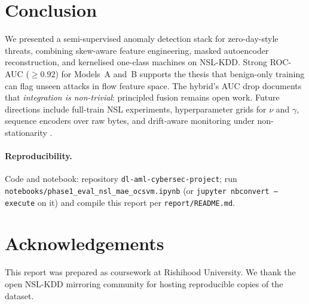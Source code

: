 \documentclass[11pt,a4paper]{article}
\begin{document}
\section{Conclusion}
\label{sec:conclusion}

We presented a semi-supervised anomaly detection stack for zero-day-style threats, combining skew-aware feature engineering, masked autoencoder reconstruction, and kernelised one-class machines on NSL-KDD. Strong ROC-AUC ($\geq 0.92$) for Models~A and~B supports the thesis that benign-only training can flag unseen attacks in flow feature space. The hybrid's AUC drop documents that \emph{integration is non-trivial}: principled fusion remains open work. Future directions include full-train NSL experiments, hyperparameter grids for $\nu$ and $\gamma$, sequence encoders over raw bytes, and drift-aware monitoring under non-stationarity \citep{mahoney2002learning}.

\paragraph{Reproducibility.} Code and notebook: repository \texttt{dl-aml-cybersec-project}; run \texttt{notebooks/phase1\_eval\_nsl\_mae\_ocsvm.ipynb} (or \texttt{jupyter nbconvert --execute} on it) and compile this report per \texttt{report/README.md}.

\section*{Acknowledgements}
This report was prepared as coursework at Rishihood University. We thank the open NSL-KDD mirroring community for hosting reproducible copies of the dataset.



\end{document}
